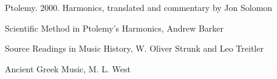 Ptolemy. 2000. Harmonics, translated and commentary by Jon Solomon

Scientific Method in Ptolemy's Harmonics, Andrew Barker

Source Readings in Music History, W. Oliver Strunk and Leo Treitler

Ancient Greek Music, M. L. West

